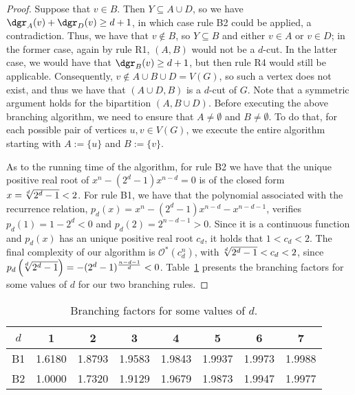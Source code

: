 \documentclass[a4paper,UKenglish,cleveref, autoref]{lipics-v2019}
\newcommand{\ig}[1]{\textcolor{red}{[Ig: #1]}}
\newcommand{\bigOs}[1]{\mathcal{O}^*\!\left(#1\right)}
\begin{document}
\begin{proof}
    Suppose that $v \in B$. Then $Y \subseteq A \cup D$, so we have $\dgr_A(v) + \dgr_D(v) \geq d+1$, in which case rule B2 could be applied, a contradiction.
    Thus, we have that $v \notin B$, so $Y \subseteq B$ and either $v \in A$ or $v \in D$;
    in the former case, again by rule R1, $(A, B)$ would not be a $d$-cut.
     In the latter case, we would have that $\dgr_B(v) \geq d+1$, but then rule R4 would still be applicable.
    Consequently, $v \notin A \cup B \cup D = V(G)$, so such a vertex does not exist, and thus we have that $(A \cup D, B)$ is a $d$-cut of $G$.
    Note that a symmetric argument holds for the bipartition $(A, B \cup D)$.
    Before executing the above branching algorithm, we need to ensure that $A \neq \emptyset$ and $B \neq \emptyset$.
    To do that, for each possible pair of vertices $u,v \in V(G)$, we execute the entire algorithm starting with $A := \{u\}$ and $B := \{v\}$.

    As to the running time of the algorithm, for rule B2 we have that the unique positive real root of $x^n - (2^d - 1)x^{n - d} = 0$ is of the closed form $x = \sqrt[\leftroot{2}d]{2^d - 1} < 2$.
    For rule B1, we have that the polynomial associated with the recurrence relation, $p_d(x) = x^n - (2^d - 1)x^{n - d} - x^{n - d - 1}$, verifies $p_d(1) = 1 - 2^d < 0$ and $p_d(2) = 2^{n - d - 1} > 0$.
    Since it is a continuous function and $p_d(x)$ has an unique positive real root $c_d$, it holds that $1 < c_d < 2$.
    The final complexity of our algorithm is $\bigOs{c_d^n}$, with $\sqrt[\leftroot{2}d]{2^d - 1} < c_d < 2$, since $p_d\left(\sqrt[\leftroot{2}d]{2^d - 1}\right) = -(2^d - 1)^{\frac{n-d-1}{d}} < 0$.
    Table~\ref{tab:exact_values} presents the branching factors for some values of $d$ for our two branching rules.\end{proof}


\begin{table}[!htb]
    \centering
    \begin{tabular}{c|ccccccc}
         $d$ & 1 & 2 & 3 & 4 & 5 & 6 & 7\\
         \hline
         B1 & 1.6180 & 1.8793 & 1.9583 & 1.9843 & 1.9937 & 1.9973 & 1.9988 \\
         B2 & 1.0000 & 1.7320 & 1.9129 & 1.9679 & 1.9873 & 1.9947 & 1.9977 \\

    \end{tabular}\medskip
    \caption{\centering Branching factors for some values of $d$.}
    \label{tab:exact_values}
\end{table}
\end{document}
